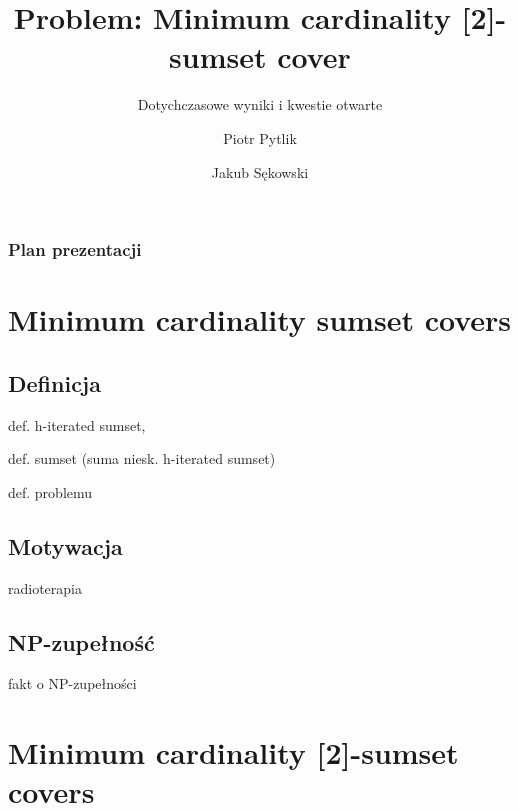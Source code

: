 \documentclass{beamer}
\begin{document}
\title{Problem: Minimum cardinality [2]-sumset cover}
\subtitle{Dotychczasowe wyniki i kwestie otwarte}
\author[Piotr Pytlik \& Jakub Sękowski]{Piotr Pytlik \and Jakub Sękowski}

\begin{frame}
	\titlepage
\end{frame}

\begin{frame}
	\frametitle{Plan prezentacji}
	\tableofcontents
\end{frame}

\section{Minimum cardinality sumset covers}
	\subsection{Definicja}
		\begin{frame}
			def. h-iterated sumset,
		
			def. sumset (suma niesk. h-iterated sumset)
		
			def. problemu
		\end{frame}
		
	\subsection{Motywacja}
		\begin{frame}
			radioterapia
		\end{frame}	
			
	\subsection{NP-zupełność}
		\begin{frame}
			fakt o NP-zupełności
		\end{frame}
		
\section{Minimum cardinality [2]-sumset covers}
\end{document}
